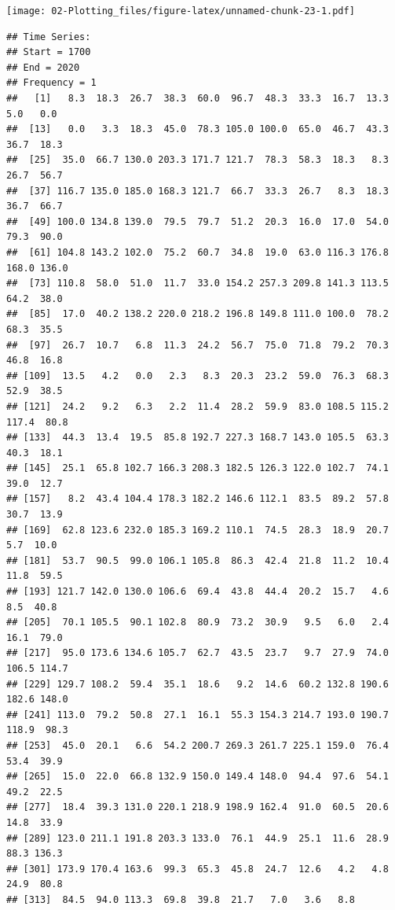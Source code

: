\documentclass[
]{book}
\newenvironment{Shaded}{\begin{snugshade}}{\end{snugshade}}
\newcommand{\AttributeTok}[1]{\textcolor[rgb]{0.77,0.63,0.00}{#1}}
\newcommand{\CommentTok}[1]{\textcolor[rgb]{0.56,0.35,0.01}{\textit{#1}}}
\newcommand{\DecValTok}[1]{\textcolor[rgb]{0.00,0.00,0.81}{#1}}
\newcommand{\FunctionTok}[1]{\textcolor[rgb]{0.00,0.00,0.00}{#1}}
\newcommand{\NormalTok}[1]{#1}
\newcommand{\OtherTok}[1]{\textcolor[rgb]{0.56,0.35,0.01}{#1}}
\newcommand{\SpecialCharTok}[1]{\textcolor[rgb]{0.00,0.00,0.00}{#1}}
\theoremstyle{definition}
\theoremstyle{definition}
\theoremstyle{definition}
\theoremstyle{definition}
\theoremstyle{remark}
\begin{document}
\texttt{[image: 02-Plotting\_files/figure-latex/unnamed-chunk-23-1.pdf]}

\begin{Shaded}
\end{Shaded}

\begin{verbatim}
## Time Series:
## Start = 1700 
## End = 2020 
## Frequency = 1 
##   [1]   8.3  18.3  26.7  38.3  60.0  96.7  48.3  33.3  16.7  13.3   5.0   0.0
##  [13]   0.0   3.3  18.3  45.0  78.3 105.0 100.0  65.0  46.7  43.3  36.7  18.3
##  [25]  35.0  66.7 130.0 203.3 171.7 121.7  78.3  58.3  18.3   8.3  26.7  56.7
##  [37] 116.7 135.0 185.0 168.3 121.7  66.7  33.3  26.7   8.3  18.3  36.7  66.7
##  [49] 100.0 134.8 139.0  79.5  79.7  51.2  20.3  16.0  17.0  54.0  79.3  90.0
##  [61] 104.8 143.2 102.0  75.2  60.7  34.8  19.0  63.0 116.3 176.8 168.0 136.0
##  [73] 110.8  58.0  51.0  11.7  33.0 154.2 257.3 209.8 141.3 113.5  64.2  38.0
##  [85]  17.0  40.2 138.2 220.0 218.2 196.8 149.8 111.0 100.0  78.2  68.3  35.5
##  [97]  26.7  10.7   6.8  11.3  24.2  56.7  75.0  71.8  79.2  70.3  46.8  16.8
## [109]  13.5   4.2   0.0   2.3   8.3  20.3  23.2  59.0  76.3  68.3  52.9  38.5
## [121]  24.2   9.2   6.3   2.2  11.4  28.2  59.9  83.0 108.5 115.2 117.4  80.8
## [133]  44.3  13.4  19.5  85.8 192.7 227.3 168.7 143.0 105.5  63.3  40.3  18.1
## [145]  25.1  65.8 102.7 166.3 208.3 182.5 126.3 122.0 102.7  74.1  39.0  12.7
## [157]   8.2  43.4 104.4 178.3 182.2 146.6 112.1  83.5  89.2  57.8  30.7  13.9
## [169]  62.8 123.6 232.0 185.3 169.2 110.1  74.5  28.3  18.9  20.7   5.7  10.0
## [181]  53.7  90.5  99.0 106.1 105.8  86.3  42.4  21.8  11.2  10.4  11.8  59.5
## [193] 121.7 142.0 130.0 106.6  69.4  43.8  44.4  20.2  15.7   4.6   8.5  40.8
## [205]  70.1 105.5  90.1 102.8  80.9  73.2  30.9   9.5   6.0   2.4  16.1  79.0
## [217]  95.0 173.6 134.6 105.7  62.7  43.5  23.7   9.7  27.9  74.0 106.5 114.7
## [229] 129.7 108.2  59.4  35.1  18.6   9.2  14.6  60.2 132.8 190.6 182.6 148.0
## [241] 113.0  79.2  50.8  27.1  16.1  55.3 154.3 214.7 193.0 190.7 118.9  98.3
## [253]  45.0  20.1   6.6  54.2 200.7 269.3 261.7 225.1 159.0  76.4  53.4  39.9
## [265]  15.0  22.0  66.8 132.9 150.0 149.4 148.0  94.4  97.6  54.1  49.2  22.5
## [277]  18.4  39.3 131.0 220.1 218.9 198.9 162.4  91.0  60.5  20.6  14.8  33.9
## [289] 123.0 211.1 191.8 203.3 133.0  76.1  44.9  25.1  11.6  28.9  88.3 136.3
## [301] 173.9 170.4 163.6  99.3  65.3  45.8  24.7  12.6   4.2   4.8  24.9  80.8
## [313]  84.5  94.0 113.3  69.8  39.8  21.7   7.0   3.6   8.8
\end{verbatim}
\end{document}
